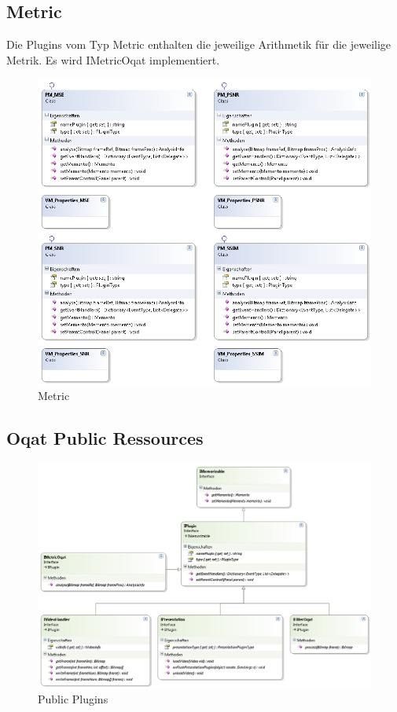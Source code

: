 \subsection{Metric}
Die Plugins vom Typ Metric enthalten die jeweilige Arithmetik für die jeweilige Metrik. Es wird IMetricOqat implementiert.
\begin{figure}[H]
\noindent\includegraphics[width=\linewidth,height=\textheight,
keepaspectratio]{bilder/Klassendiagramm/Plugins2.png}
\caption{Metric}
\end{figure}

\pagebreak
\subsection{Oqat Public Ressources}
\begin{figure}[H]
\noindent\includegraphics[width=\linewidth,height=\textheight,
keepaspectratio]{bilder/Klassendiagramm/PluginInterfaces.png}
\caption{Public Plugins}
\end{figure}

